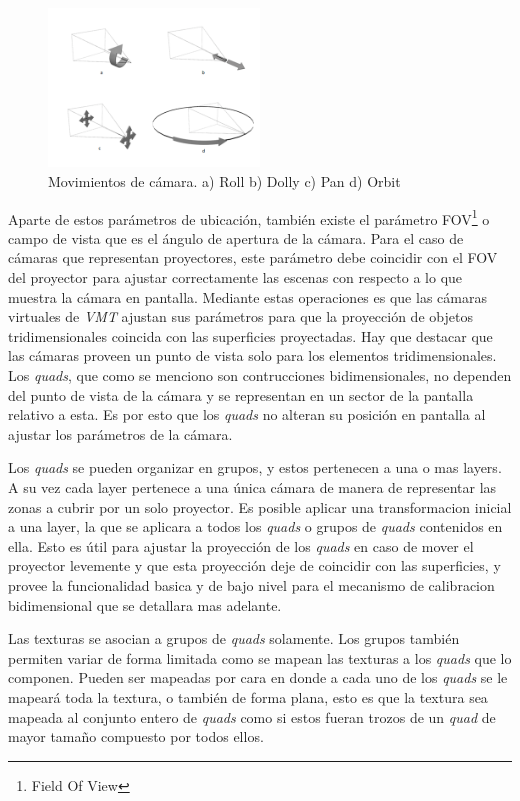 \begin{figure}[H]
  \centering
    \includegraphics[width=0.5\textwidth]{./Cap5_vmt/vmtengine-cameramove.png}
  \caption{Movimientos de cámara. a) Roll b) Dolly c) Pan d) Orbit}
  \label{fig:VMT-CameraMove}
\end{figure}

Aparte de estos parámetros de ubicación, también existe el parámetro FOV\footnote{Field Of View} o campo de vista que es el ángulo de apertura de la cámara. Para el caso de cámaras que representan proyectores, este parámetro debe coincidir con el FOV del proyector para ajustar correctamente las escenas con respecto a lo que muestra la cámara en pantalla.
Mediante estas operaciones es que las cámaras virtuales de \emph{VMT} ajustan sus parámetros para que la proyección de objetos tridimensionales coincida con las superficies proyectadas.
Hay que destacar que las cámaras proveen un punto de vista solo para los elementos tridimensionales. Los \emph{quads}, que como se menciono son contrucciones bidimensionales, no dependen del punto de vista de la cámara y se representan en un sector de la pantalla relativo a esta. Es por esto que los \emph{quads} no alteran su posición en pantalla al ajustar los parámetros de la cámara.

Los \emph{quads} se pueden organizar en grupos, y estos pertenecen a una o mas layers. A su vez cada layer pertenece a una única cámara de manera de representar las zonas a cubrir por un solo proyector. Es posible aplicar una transformacion inicial a una layer, la que se aplicara a todos los \emph{quads} o grupos de \emph{quads} contenidos en ella. Esto es útil para ajustar la proyección de los \emph{quads} en caso de mover el proyector levemente y que esta proyección deje de coincidir con las superficies, y provee la funcionalidad basica y de bajo nivel para el mecanismo de calibracion bidimensional que se detallara mas adelante.

Las texturas se asocian a grupos de \emph{quads} solamente. Los grupos también permiten variar de forma limitada como se mapean las texturas a los \emph{quads} que lo componen. Pueden ser mapeadas por cara en donde a cada uno de los \emph{quads} se le mapeará toda la textura, o también de forma plana, esto es que la textura sea mapeada al conjunto entero de \emph{quads} como si estos fueran trozos de un \emph{quad} de mayor tamaño compuesto por todos ellos.

